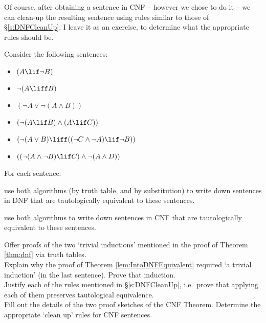 Of course, after obtaining a sentence in CNF -- however we chose to do it -- we can clean-up the resulting sentence using rules similar to those of \S\ref{s:DNFCleanUp}. I leave it as an exercise, to determine what the appropriate rules should be.

\practiceproblems
\problempart
\label{pr.DNF}
Consider the following sentences:
	\begin{itemize}
		\item $(A \lif \lnot B)$
		\item $\lnot (A \liff B)$
		\item $(\lnot A \lor \lnot (A \land B))$
		\item $(\lnot (A \lif B ) \land (A \lif C))$
		\item $(\lnot (A \lor B) \liff ((\lnot C \land \lnot A) \lif \lnot B))$
		\item $((\lnot (A \land \lnot B) \lif C) \land \lnot (A \land D))$
	\end{itemize}
For each sentence:
	\begin{ebullet}
		\item use both algorithms (by truth table, and by substitution) to write down sentences in DNF that are tautologically equivalent to these sentences.
		\item use both algorithms to write down sentences in CNF that are tautologically equivalent to these sentences. 
	\end{ebullet}

\problempart
Offer proofs of the two `trivial inductions' mentioned in the proof of Theorem \ref{thm:dnf} via truth tables.\\

\problempart
Explain why the proof of Theorem \ref{lem:IntoDNFEquivalent} required `a trivial induction' (in the last sentence). Prove that induction.\\


\problempart
Justify each of the rules mentioned in \S\ref{s:DNFCleanUp}, i.e.\ prove that applying each of them preserves tautological equivalence.\\

\problempart
Fill out the details of the two proof sketches of the CNF Theorem. Determine the appropriate `clean up' rules for CNF sentences.

%